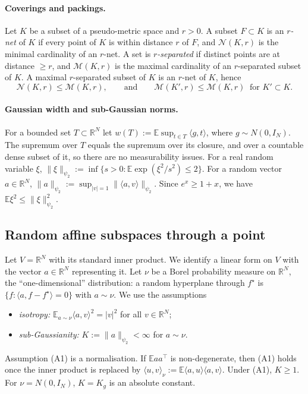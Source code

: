 \documentclass[11pt]{article}
\theoremstyle{definition}
\numberwithin{equation}{section}
\newcommand{\R}{\mathbb{R}}
\newcommand{\E}{\mathbb{E}}
\newcommand{\fs}{f^{\star}}
\newcommand{\cN}{\mathcal{N}}
\newcommand{\cM}{\mathcal{M}}
\newcommand{\psitwo}[1]{\lVert #1\rVert_{\psi_2}}
\begin{document}
\paragraph{Coverings and packings.}
Let $K$ be a subset of a pseudo-metric space and $r>0$. A subset $F\subset K$ is an \emph{$r$-net} of $K$ if every point of $K$ is within distance $r$ of $F$, and $\cN(K,r)$ is the minimal cardinality of an $r$-net. A set is \emph{$r$-separated} if distinct points are at distance $\ge r$, and $\cM(K,r)$ is the maximal cardinality of an $r$-separated subset of $K$. A maximal $r$-separated subset of $K$ is an $r$-net of $K$, hence
\begin{equation}\label{eq:net-sep}
\cN(K,r)\le\cM(K,r),\qquad\text{and}\qquad\cM(K',r)\le\cM(K,r)\ \text{ for }K'\subset K.
\end{equation}

\paragraph{Gaussian width and sub-Gaussian norms.}
For a bounded set $T\subset\R^N$ let $w(T):=\E\sup_{t\in T}\langle g,t\rangle$, where $g\sim N(0,I_N)$. The supremum over $T$ equals the supremum over its closure, and over a countable dense subset of it, so there are no measurability issues. For a real random variable $\xi$, $\psitwo{\xi}:=\inf\{s>0:\E\exp(\xi^2/s^2)\le2\}$. For a random vector $a\in\R^N$, $\psitwo{a}:=\sup_{|v|=1}\psitwo{\langle a,v\rangle}$. Since $e^x\ge1+x$, we have $\E\xi^2\le\psitwo{\xi}^2$.

\subsection{Random affine subspaces through a point}\label{sec:randomH}

Let $V=\R^N$ with its standard inner product. We identify a linear form on $V$ with the vector $a\in\R^N$ representing it. Let $\nu$ be a Borel probability measure on $\R^N$, the ``one-dimensional'' distribution: a random hyperplane through $\fs$ is $\{f:\langle a,f-\fs\rangle=0\}$ with $a\sim\nu$. We use the assumptions
\begin{itemize}
\item[(A1)] \emph{isotropy:} $\E_{a\sim\nu}\langle a,v\rangle^2=|v|^2$ for all $v\in\R^N$;
\item[(A2)] \emph{sub-Gaussianity:} $K:=\psitwo{a}<\infty$ for $a\sim\nu$.
\end{itemize}
Assumption (A1) is a normalisation. If $\E aa^\top$ is non-degenerate, then (A1) holds once the inner product is replaced by $\langle u,v\rangle_\nu:=\E\langle a,u\rangle\langle a,v\rangle$. Under (A1), $K\ge1$. For $\nu=N(0,I_N)$, $K=K_g$ is an absolute constant.
\end{document}
